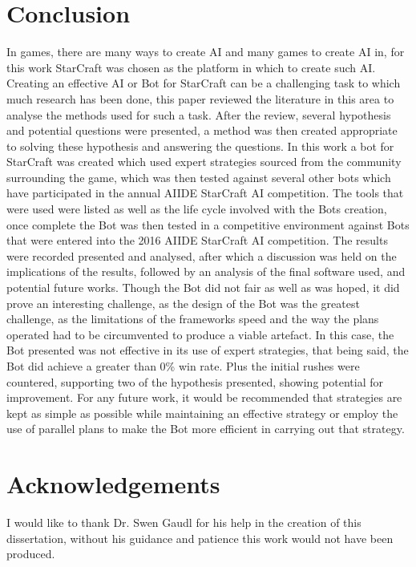 \documentclass[journal]{IEEEtran}
\begin{document}
	\section{Conclusion}
	In games, there are many ways to create AI and many games to create AI in, for this work StarCraft was chosen as the platform in which to create such AI. Creating an effective AI or Bot for StarCraft can be a challenging task to which much research has been done, this paper reviewed the literature in this area to analyse the methods used for such a task. After the review, several hypothesis and potential questions were presented, a method was then created appropriate to solving these hypothesis and answering the questions. In this work a bot for StarCraft was created which used expert strategies sourced from the community surrounding the game, which was then tested against several other bots which have participated in the annual AIIDE StarCraft AI competition. The tools that were used were listed as well as the life cycle involved with the Bots creation, once complete the Bot was then tested in a competitive environment against Bots that were entered into the 2016 AIIDE StarCraft AI competition. The results were recorded presented and analysed, after which a discussion was held on the implications of the results, followed by an analysis of the final software used, and potential future works. 
	Though the Bot did not fair as well as was hoped, it did prove an interesting challenge, as the design of the Bot was the greatest challenge, as the limitations of the frameworks speed and the way the plans operated had to be circumvented to produce a viable artefact. In this case, the Bot presented was not effective in its use of expert strategies, that being said, the Bot did achieve a greater than 0\% win rate. Plus the initial rushes were countered, supporting two of the hypothesis presented, showing potential for improvement. For any future work, it would be recommended that strategies are kept as simple as possible while maintaining an effective strategy or employ the use of parallel plans to make the Bot more efficient in carrying out that strategy.    
	
	
	
	
	
	\appendices
	\section*{Acknowledgements}
	I would like to thank Dr. Swen Gaudl for his help in the creation of this dissertation, without his guidance and patience this work would not have been produced.
	
\end{document}
